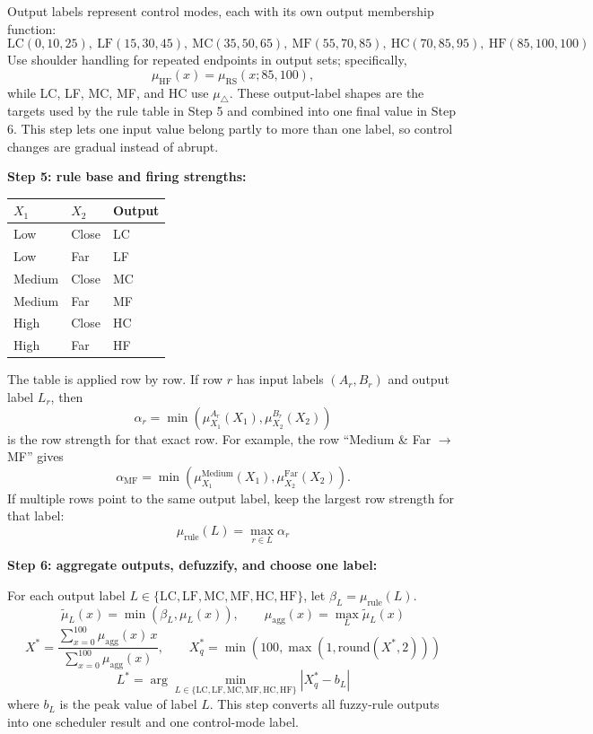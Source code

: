 \documentclass{article}
\begin{document}
\noindent Output labels represent control modes, each with its own output membership function:
\[
\text{LC}(0,10,25),\ \text{LF}(15,30,45),\ \text{MC}(35,50,65),\ 
\text{MF}(55,70,85),\ \text{HC}(70,85,95),\ \text{HF}(85,100,100)
\]
\noindent Use shoulder handling for repeated endpoints in output sets; specifically,
\[
\mu_{\text{HF}}(x)=\mu_{\text{RS}}(x;85,100),
\]
\noindent while LC, LF, MC, MF, and HC use $\mu_{\triangle}$.
\noindent These output-label shapes are the targets used by the rule table in Step 5 and combined into one final value in Step 6.
\noindent This step lets one input value belong partly to more than one label, so control changes are gradual instead of abrupt.

\noindent\textbf{Step 5: rule base and firing strengths:}\par
\begin{center}
\begin{tabular}{lll}
\toprule
$X_1$ & $X_2$ & Output \\
\midrule
Low & Close & LC \\
Low & Far & LF \\
Medium & Close & MC \\
Medium & Far & MF \\
High & Close & HC \\
High & Far & HF \\
\bottomrule
\end{tabular}
\end{center}
\noindent The table is applied row by row. If row $r$ has input labels $(A_r,B_r)$ and output label $L_r$, then
\[
\alpha_r=\min\left(\mu_{X_1}^{A_r}(X_1),\mu_{X_2}^{B_r}(X_2)\right)
\]
is the row strength for that exact row.
For example, the row ``Medium \& Far $\rightarrow$ MF'' gives
\[
\alpha_{\text{MF}}=\min\left(\mu_{X_1}^{\text{Medium}}(X_1),\mu_{X_2}^{\text{Far}}(X_2)\right).
\]
If multiple rows point to the same output label, keep the largest row strength for that label:
\[
\mu_{\text{rule}}(L)=\max_{r\in L} \alpha_r
\]

\noindent\textbf{Step 6: aggregate outputs, defuzzify, and choose one label:}\par
\noindent For each output label $L\in\{\mathrm{LC,LF,MC,MF,HC,HF}\}$, let $\beta_L=\mu_{\text{rule}}(L)$.
\[
\tilde{\mu}_L(x)=\min(\beta_L,\mu_L(x)),\qquad
\mu_{\text{agg}}(x)=\max_L \tilde{\mu}_L(x)
\]
\[
X^*=\frac{\sum_{x=0}^{100}\mu_{\text{agg}}(x)\,x}{\sum_{x=0}^{100}\mu_{\text{agg}}(x)},\qquad
X_q^*=\min(100,\max(1,\mathrm{round}(X^*,2)))
\]
\[
L^*=\arg\min_{L\in\{\mathrm{LC,LF,MC,MF,HC,HF}\}}|X_q^*-b_L|
\]
\noindent where $b_L$ is the peak value of label $L$.
\noindent This step converts all fuzzy-rule outputs into one scheduler result and one control-mode label.
\end{document}

